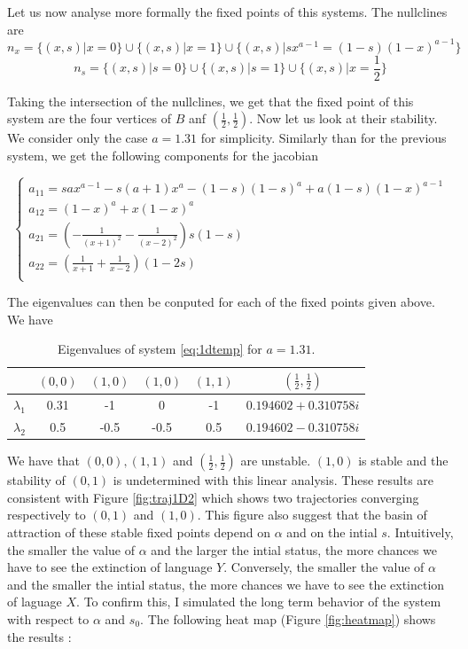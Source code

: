 \documentclass{article}
\begin{document}
Let us now analyse more formally the fixed points of this systems.
The nullclines are
$$n_x = \{(x,s) | x=0 \} \cup \{ (x,s)| x = 1 \} \cup \{ (x,s) | sx^{a-1} = (1-s)(1-x)^{a-1} \}$$
$$n_s = \{(x,s) | s=0 \} \cup \{ (x,s)| s = 1 \} \cup \{ (x,s) | x= \frac{1}{2} \}$$

Taking the intersection of the nullclines, we get that the fixed point of this system are the four vertices of $B$ anf $(\frac{1}{2}, \frac{1}{2})$.
Now let us look at their stability.
We consider only the case $a=1.31$ for simplicity.
Similarly than for the previous system, we get the following components for the jacobian

\[
\begin{cases}
a_{11} = sax^{a-1} - s(a+1)x^a - (1-s)(1-s)^a + a(1-s)(1-x)^{a-1} \\
a_{12} = (1-x)^a + x(1-x)^a \\
a_{21} = (-\frac{1}{(x+1)^2}-\frac{1}{(x-2)^2})s(1-s) \\
a_{22} = (\frac{1}{x+1}+\frac{1}{x-2})(1-2s) \\
\end{cases}
\]

The eigenvalues can then be conputed for each of the fixed points given above.
We have
\begin{table}[h]
  \centering
  \begin{tabular}{cccccc}
    & $(0,0)$ & $(1,0)$ & $(1,0)$ & $(1,1)$ & $(\frac{1}{2}, \frac{1}{2})$ \\
    \hline
    $\lambda_1$ & 0.31 & -1 & 0 & -1 & $0.194602+0.310758i$ \\
    \hline
    $\lambda_2$ & 0.5 & -0.5 & -0.5 & 0.5 & $0.194602-0.310758i$ \\
    \hline
  \end{tabular}
  \caption{Eigenvalues of system \ref{eq:1dtemp} for $a=1.31$.}
  \label{tab:eig}
\end{table}

We have that $(0,0), (1,1)$ and $(\frac{1}{2}, \frac{1}{2})$ are unstable. $(1,0)$ is stable and the stability of $(0,1)$ is undetermined with this linear analysis.
These results are consistent with Figure \ref{fig:traj1D2} which shows two trajectories converging respectively to $(0,1)$ and $(1,0)$.
This figure also suggest that the basin of attraction of these stable fixed points depend on $\alpha$ and on the intial $s$.
Intuitively, the smaller the value of $\alpha$ and the larger the intial status, the more chances we have to see the extinction of language $Y$.
Conversely, the smaller the value of $\alpha$ and the smaller the intial status, the more chances we have to see the extinction of laguage $X$.
To confirm this, I simulated the long term behavior of the system with respect to $\alpha$ and $s_0$.
The following heat map (Figure \ref{fig:heatmap}) shows the results :
\end{document}
